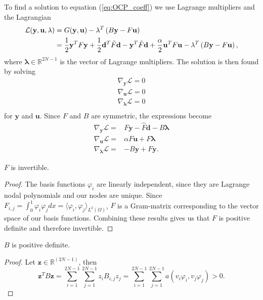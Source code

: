 To find a solution to equation (\ref{eq:OCP_coeff}) we use Lagrange multipliers and the Lagrangian
\begin{align}
    \label{eq:OCP_lagrangian}
    \mathcal{L}(\mathbf{y, u, \lambda}) &= G(\mathbf{y, u}) - \mathbf{\lambda}^T \left( B\mathbf{y} - F\mathbf{u} \right) \\
    &= \frac{1}{2}\mathbf{y}^T F \mathbf{y} + \frac{1}{2}\mathbf{d}^T\Tilde{F} \mathbf{d} - \mathbf{y}^T\hat{F}\mathbf{d} + \frac{\alpha}{2}\mathbf{u}^T F \mathbf{u}  - \mathbf{\lambda}^T \left( B\mathbf{y} - F\mathbf{u} \right) ,
\end{align}
where $\mathbf{\lambda} \in \mathds{R}^{2N-1}$ is the vector of Lagrange multipliers.
The solution is then found by solving
\begin{align}
    \label{eq:gradients}
    \nabla_{\mathbf{y}}\mathcal{L} = 0 \\
    \nabla_{\mathbf{u}}\mathcal{L} = 0 \\
    \nabla_{\mathbf{\mathbf{\lambda}}}\mathcal{L} = 0 \\
\end{align}
for $\mathbf{y}$ and $\mathbf{u}$.
Since $F$ and $B$ are symmetric, the expressions become
\begin{align}
    \nabla_{\mathbf{y}}\mathcal{L} =& F  \mathbf{y}- \hat{F}\mathbf{d} - B\mathbf{\lambda} \\
    \nabla_{\mathbf{u}}\mathcal{L} =&  \alpha F \mathbf{u}+ F\mathbf{\lambda} \\
    \nabla_{\mathbf{\lambda}}\mathcal{L} =& -B \mathbf{y} + F \mathbf{y}.
\end{align}

\begin{lemma}
    $F$ is invertible.    
\end{lemma}
\begin{proof}
    \label{lemma:F_invertible}
    The basis functions $\varphi_i$ are linearly independent, since they are Lagrange nodal polynomials and our nodes are unique.
    Since $F_{i,j} = \int_0^1 \varphi_i \varphi_j dx = \langle \varphi_i, \varphi_j \rangle_{L^2(\Omega)}$,
    $F$ is a Gram-matrix corresponding to the vector space of our basis functions.
    Combining these results gives us that $F$ is positive definite and therefore invertible.
\end{proof}

\begin{lemma}
    \label{lemma:B_pos_def}
    $B$ is positive definite.
\end{lemma}
\begin{proof}
    Let $\mathbf{z} \in \mathds{R}^{(2N-1)}$, then 
    $$\mathbf{z}^T B \mathbf{z} = \sum_{i=1}^{2N-1}\sum_{j=1}^{2N-1} z_i B_{i,j}z_j =\sum_{i=1}^{2N-1}\sum_{j=1}^{2N-1}a(v_i \varphi_i, v_j\varphi_j) >0 .$$
\end{proof}

